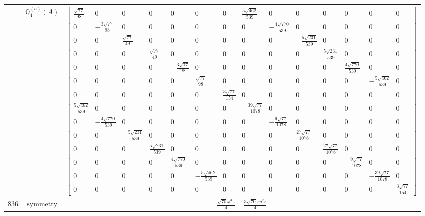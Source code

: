 \documentclass[fleqn,8pt,landscape]{jsarticle}
\begin{document}
\begin{longtable}{ccc}
$  $ & $ \mathbb{Q}_{4}^{(a)}(A) $ & $ \begin{bmatrix} \frac{\sqrt{77}}{98} & 0 & 0 & 0 & 0 & 0 & 0 & \frac{5 \sqrt{462}}{539} & 0 & 0 & 0 & 0 & 0 & 0 \\ 0 & - \frac{3 \sqrt{77}}{98} & 0 & 0 & 0 & 0 & 0 & 0 & - \frac{4 \sqrt{770}}{539} & 0 & 0 & 0 & 0 & 0 \\ 0 & 0 & \frac{\sqrt{77}}{49} & 0 & 0 & 0 & 0 & 0 & 0 & - \frac{5 \sqrt{231}}{539} & 0 & 0 & 0 & 0 \\ 0 & 0 & 0 & \frac{\sqrt{77}}{49} & 0 & 0 & 0 & 0 & 0 & 0 & \frac{5 \sqrt{231}}{539} & 0 & 0 & 0 \\ 0 & 0 & 0 & 0 & - \frac{3 \sqrt{77}}{98} & 0 & 0 & 0 & 0 & 0 & 0 & \frac{4 \sqrt{770}}{539} & 0 & 0 \\ 0 & 0 & 0 & 0 & 0 & \frac{\sqrt{77}}{98} & 0 & 0 & 0 & 0 & 0 & 0 & - \frac{5 \sqrt{462}}{539} & 0 \\ 0 & 0 & 0 & 0 & 0 & 0 & \frac{3 \sqrt{77}}{154} & 0 & 0 & 0 & 0 & 0 & 0 & 0 \\ \frac{5 \sqrt{462}}{539} & 0 & 0 & 0 & 0 & 0 & 0 & - \frac{39 \sqrt{77}}{1078} & 0 & 0 & 0 & 0 & 0 & 0 \\ 0 & - \frac{4 \sqrt{770}}{539} & 0 & 0 & 0 & 0 & 0 & 0 & - \frac{9 \sqrt{77}}{1078} & 0 & 0 & 0 & 0 & 0 \\ 0 & 0 & - \frac{5 \sqrt{231}}{539} & 0 & 0 & 0 & 0 & 0 & 0 & \frac{27 \sqrt{77}}{1078} & 0 & 0 & 0 & 0 \\ 0 & 0 & 0 & \frac{5 \sqrt{231}}{539} & 0 & 0 & 0 & 0 & 0 & 0 & \frac{27 \sqrt{77}}{1078} & 0 & 0 & 0 \\ 0 & 0 & 0 & 0 & \frac{4 \sqrt{770}}{539} & 0 & 0 & 0 & 0 & 0 & 0 & - \frac{9 \sqrt{77}}{1078} & 0 & 0 \\ 0 & 0 & 0 & 0 & 0 & - \frac{5 \sqrt{462}}{539} & 0 & 0 & 0 & 0 & 0 & 0 & - \frac{39 \sqrt{77}}{1078} & 0 \\ 0 & 0 & 0 & 0 & 0 & 0 & 0 & 0 & 0 & 0 & 0 & 0 & 0 & \frac{3 \sqrt{77}}{154} \end{bmatrix} $ \\ \hline
$ 836 $ & $ \text{symmetry} $ & $ \frac{\sqrt{70} x^{3} z}{4} - \frac{3 \sqrt{70} x y^{2} z}{4} $ \\

\end{longtable}
\end{document}
